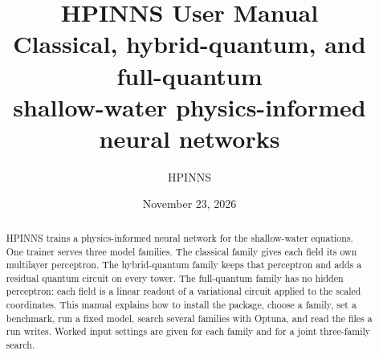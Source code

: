 \documentclass[11pt,letterpaper]{report}
\title{%
  HPINNS User Manual\\[0.4em]
  \large Classical, hybrid-quantum, and full-quantum\\
  shallow-water physics-informed neural networks}
\author{HPINNS}
\date{November 23, 2026}
\begin{document}
\maketitle

\begin{abstract}
\noindent
HPINNS trains a physics-informed neural network for the shallow-water equations.
One trainer serves three model families.
The classical family gives each field its own multilayer perceptron.
The hybrid-quantum family keeps that perceptron and adds a residual quantum circuit on every tower.
The full-quantum family has no hidden perceptron: each field is a linear readout of a variational circuit applied to the scaled coordinates.
This manual explains how to install the package, choose a family, set a benchmark, run a fixed model, search several families with Optuna, and read the files a run writes.
Worked input settings are given for each family and for a joint three-family search.
\end{abstract}

\tableofcontents











\end{document}
